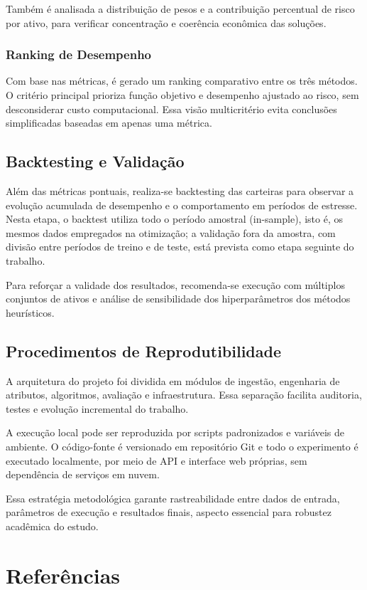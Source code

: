 \documentclass[
  12pt,
  oneside,
  a4paper,
  brazil
]{abntex2}
\begin{document}
Também é analisada a distribuição de pesos e a contribuição percentual de risco por ativo, para verificar concentração e coerência econômica das soluções.

\subsection{Ranking de Desempenho}
Com base nas métricas, é gerado um ranking comparativo entre os três métodos. O critério principal prioriza função objetivo e desempenho ajustado ao risco, sem desconsiderar custo computacional. Essa visão multicritério evita conclusões simplificadas baseadas em apenas uma métrica.

\section{Backtesting e Validação}
Além das métricas pontuais, realiza-se backtesting das carteiras para observar a evolução acumulada de desempenho e o comportamento em períodos de estresse. Nesta etapa, o backtest utiliza todo o período amostral (in-sample), isto é, os mesmos dados empregados na otimização; a validação fora da amostra, com divisão entre períodos de treino e de teste, está prevista como etapa seguinte do trabalho.

Para reforçar a validade dos resultados, recomenda-se execução com múltiplos conjuntos de ativos e análise de sensibilidade dos hiperparâmetros dos métodos heurísticos.

\section{Procedimentos de Reprodutibilidade}
A arquitetura do projeto foi dividida em módulos de ingestão, engenharia de atributos, algoritmos, avaliação e infraestrutura. Essa separação facilita auditoria, testes e evolução incremental do trabalho.

A execução local pode ser reproduzida por scripts padronizados e variáveis de ambiente. O código-fonte é versionado em repositório Git e todo o experimento é executado localmente, por meio de API e interface web próprias, sem dependência de serviços em nuvem.

Essa estratégia metodológica garante rastreabilidade entre dados de entrada, parâmetros de execução e resultados finais, aspecto essencial para robustez acadêmica do estudo.


\postextual
\chapter*{Referências}
\end{document}
